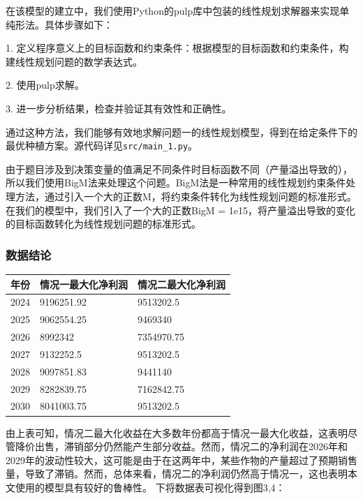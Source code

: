 \documentclass[withoutpreface]{cumcmthesis}
\begin{document}
在该模型的建立中，我们使用Python的pulp库中包装的线性规划求解器来实现单纯形法。具体步骤如下：

1. 定义程序意义上的目标函数和约束条件：根据模型的目标函数和约束条件，构建线性规划问题的数学表达式。

2. 使用pulp求解。

3. 进一步分析结果，检查并验证其有效性和正确性。

通过这种方法，我们能够有效地求解问题一的线性规划模型，得到在给定条件下的最优种植方案。源代码详见\verb|src/main_1.py|。

由于题目涉及到决策变量的值满足不同条件时目标函数不同（产量溢出导致的），所以我们使用BigM法来处理这个问题。BigM法是一种常用的线性规划约束条件处理方法，通过引入一个大的正数M，将约束条件转化为线性规划问题的标准形式。在我们的模型中，我们引入了一个大的正数BigM = 1e15，将产量溢出导致的变化的目标函数转化为线性规划问题的标准形式。

\subsubsection{数据结论}

\begin{table}[H]
    \centering
    \begin{tabular}{|l|l|l|}
    \hline
    \textbf{年份} & \textbf{情况一最大化净利润} & \textbf{情况二最大化净利润}  \\ \hline
        2024 & 9196251.92 & 9513202.5
        \\ \hline
        2025 & 9062554.25 & 9469340
        \\ \hline
        2026 & 8992342 & 7354970.75
        \\ \hline
        2027 & 9132252.5 & 9513202.5
        \\ \hline
        2028 & 9097851.83 & 9441140
        \\ \hline
        2029 & 8282839.75 & 7162842.75
        \\ \hline
        2030 & 8041003.75 & 9513202.5
        \\ \hline


    \end{tabular}
\end{table}
由上表可知，情况二最大化收益在大多数年份都高于情况一最大化收益，这表明尽管降价出售，滞销部分仍然能产生部分收益。然而，情况二的净利润在2026年和2029年的波动性较大，这可能是由于在这两年中，某些作物的产量超过了预期销售量，导致了滞销。然而，总体来看，情况二的净利润仍然高于情况一，这也表明本文使用的模型具有较好的鲁棒性。
下将数据表可视化得到图3,4：
\end{document}

